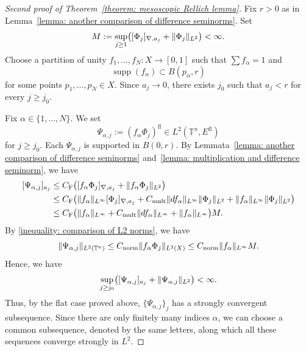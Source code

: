 \documentclass[a4paper,oneside,12pt]{amsart}
\theoremstyle{plain}
\theoremstyle{definition}
\theoremstyle{remark}
\DeclarePairedDelimiter{\norm}{\lVert}{\rVert}
\DeclarePairedDelimiter{\seminorm}{\lbrack}{\rbrack}
\DeclareMathOperator{\support}{supp}
\newcommand{\flattorus}{\mathbb{T}^n}
\newcommand{\Ltwonorm}[2][L^2]{\norm{#2}_{#1}}
\newcommand{\mesoscopicseminorm}[2][a]{\seminorm{#2}_{#1}}
\newcommand{\mesoscopicdifferenceseminorm}[2][a]{\seminorm{#2}_{\nabla,#1}}
\newcommand{\flatmodel}[1]{#1^{\mathrm{fl}}}
\newcommand{\constantLtwonorm}{C_{\mathrm{norm}}}
\newcommand{\constantcomparison}{C_{\mathrm{F}}}
\newcommand{\constantmult}{C_{\mathrm{mult}}}
\begin{document}
\begin{proof}[Second proof of Theorem~\ref{theorem: mesoscopic Rellich lemma}]
  Fix $r > 0$ as in Lemma~\ref{lemma: another comparison of difference seminorms}.
  Set
  \begin{equation}
    M := \sup_{j \ge 1} \bigl( \mesoscopicdifferenceseminorm[a_j]{\Phi_j} + \Ltwonorm{\Phi_j} \bigr) < \infty.
  \end{equation}
  Choose a partition of unity $f_1, \dots, f_N \colon X \to [0,1]$ such that $\sum f_{\alpha} = 1$ and
  \begin{equation}
    \support (f_{\alpha}) \subset B(p_{\alpha},r)
  \end{equation}
  for some points $p_1, \dots, p_N \in X$.
  Since $a_j \to 0$, there exists $j_0$ such that $a_j < r$ for every $j \ge j_0$.

  Fix $\alpha \in \{1,\dots,N\}$.
  We set
  \begin{equation}
    \Psi_{\alpha,j} := \flatmodel{(f_{\alpha}\Phi_j)} \in L^2(\flattorus,\flatmodel{E})
  \end{equation}
  for $j \ge j_0$.
  Each $\Psi_{\alpha,j}$ is supported in $B(0,r)$.
  By Lemmata~\ref{lemma: another comparison of difference seminorms} and~\ref{lemma: multiplication and difference seminorm}, we have
  \begin{equation}
    \begin{aligned}
    \mesoscopicseminorm[a_j]{\Psi_{\alpha,j}} \le{}& \constantcomparison \bigl( \mesoscopicdifferenceseminorm[a_j]{f_{\alpha} \Phi_j} + \Ltwonorm{f_{\alpha} \Phi_j} \bigr) \\
    \le{}& \constantcomparison \bigl( \norm{f_{\alpha}}_{L^{\infty}} \mesoscopicdifferenceseminorm[a_j]{\Phi_j} + \constantmult \norm{df_{\alpha}}_{L^{\infty}} \Ltwonorm{\Phi_j} + \norm{f_{\alpha}}_{L^{\infty}} \Ltwonorm{\Phi_j} \bigr) \\
    \le{}& \constantcomparison \bigl( \norm{f_{\alpha}}_{L^{\infty}} + \constantmult \norm{df_{\alpha}}_{L^{\infty}} + \norm{f_{\alpha}}_{L^{\infty}} \bigr) M.
    \end{aligned}
  \end{equation}
  By \eqref{inequality: comparison of L2 norms}, we have
  \begin{equation}
    \Ltwonorm[L^2(\flattorus)]{\Psi_{\alpha,j}} \le \constantLtwonorm \Ltwonorm[L^2(X)]{f_{\alpha} \Phi_j} \le \constantLtwonorm \norm{f_{\alpha}}_{L^{\infty}} M.
  \end{equation}
  Hence, we have
  \begin{equation}
    \sup_{j \ge j_0} \bigl( \mesoscopicseminorm[a_j]{\Psi_{\alpha,j}} + \Ltwonorm{\Psi_{\alpha,j}} \bigr) < \infty.
  \end{equation}
  Thus, by the flat case proved above, $\{\Psi_{\alpha,j}\}_j$ has a strongly convergent subsequence.
  Since there are only finitely many indices $\alpha$, we can choose a common subsequence, denoted by the same letters, along which all these sequences converge strongly in $L^2$.


\end{proof}
\end{document}
